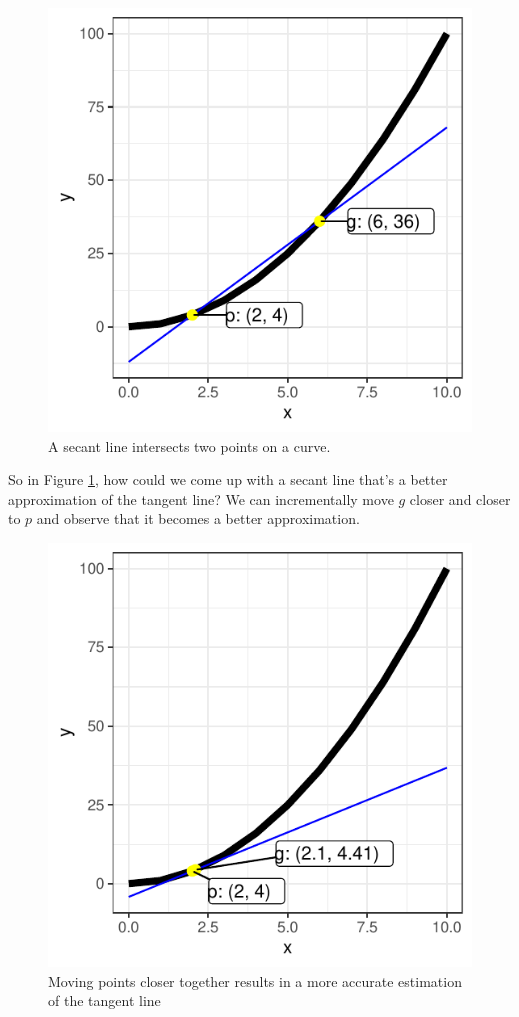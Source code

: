 \documentclass{article}
\begin{document}
\begin{figure}[H]
    \centering
    \includegraphics{secant.pdf}
    \caption{A secant line intersects two points on a curve.}
    \label{fig:secant}
\end{figure}

So in Figure \ref{fig:secant}, how could we come up with a secant line that's a better
approximation of the tangent line? We can incrementally move $g$ closer and closer to $p$
and observe that it becomes a better approximation.

\begin{figure}[H]
    \centering
    \includegraphics{updated_secant.pdf}
    \caption{Moving points closer together results in a more accurate estimation of the
    tangent line}
    \label{fig:updated_secant}
\end{figure}
\end{document}
